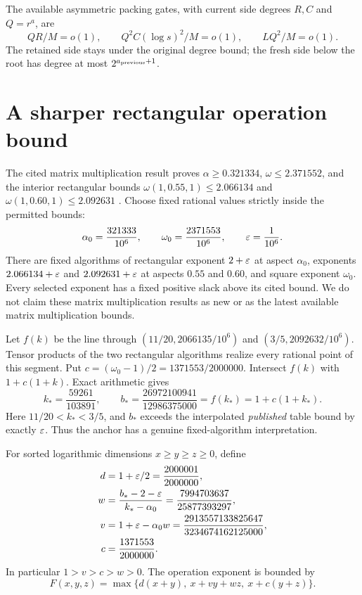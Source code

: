 The available asymmetric packing gates, with current side degrees
\(R,C\) and \(Q=r^a\), are
\begin{equation}\label{eq:gates}
 QR/M=o(1),\qquad
 Q^2C(\log s)^2/M=o(1),\qquad
 LQ^2/M=o(1).
\end{equation}
The retained side stays under the original degree bound; the fresh side
below the root has degree at most \(2^{a_{\rm previous}+1}\).

\section{A sharper rectangular operation bound}\label{sec:backend}

The cited matrix multiplication result proves
\(\alpha\ge0.321334\), \(\omega\le2.371552\), and the interior
rectangular bounds
\(\omega(1,0.55,1)\le2.066134\) and
\(\omega(1,0.60,1)\le2.092631\) \cite[Table 1]{matrix}.
Choose fixed rational values strictly inside the permitted bounds:
\[
 \alpha_0=\frac{321333}{10^6},\qquad
 \omega_0=\frac{2371553}{10^6},\qquad
 \varepsilon=\frac1{10^6}.
\]
There are fixed algorithms of rectangular exponent \(2+\varepsilon\) at aspect
\(\alpha_0\), exponents \(2.066134+\varepsilon\) and \(2.092631+\varepsilon\)
at aspects \(0.55\) and \(0.60\), and square exponent \(\omega_0\).
Every selected exponent has a fixed positive slack above its cited bound.
We do not claim these matrix multiplication results as new or as the
latest available matrix multiplication bounds.

Let \(f(k)\) be the line through
\((11/20,2066135/10^6)\) and \((3/5,2092632/10^6)\).
Tensor products of the two rectangular algorithms realize every rational
point of this segment. Put \(c=(\omega_0-1)/2=1371553/2000000\).
Intersect \(f(k)\) with \(1+c(1+k)\). Exact arithmetic gives
\[
 k_*=\frac{59261}{103891},\qquad
 b_*=\frac{26972100941}{12986375000}
     =f(k_*)=1+c(1+k_*).
\]
Here \(11/20<k_*<3/5\), and \(b_*\) exceeds the interpolated
\emph{published} table bound by exactly \(\varepsilon\).
Thus the anchor has a genuine fixed-algorithm interpretation.

For sorted logarithmic dimensions \(x\ge y\ge z\ge0\), define
\begin{align}
 d&=1+\varepsilon/2=\frac{2000001}{2000000},\notag\\
 w&=\frac{b_*-2-\varepsilon}{k_*-\alpha_0}
     =\frac{7994703637}{25877393297},\notag\\
 v&=1+\varepsilon-\alpha_0w
     =\frac{2913557133825647}{3234674162125000},\notag\\
 c&=\frac{1371553}{2000000}. \label{eq:backendcoeff}
\end{align}
In particular \(1>v>c>w>0\). The operation exponent is bounded by
\begin{equation}\label{eq:rectcost}
 F(x,y,z)=\max\{d(x+y),\ x+vy+wz,\ x+c(y+z)\}.
\end{equation}

